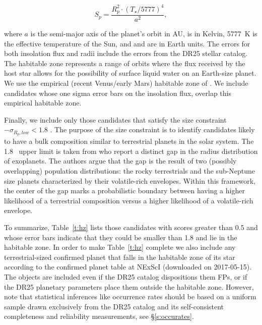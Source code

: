 \begin{equation}
S_{p} = \frac{R_{p}^{2} \cdot (T_{\star}/5777)^{4}}{a^{2}} ,
\end{equation}

\noindent where $a$ is the semi-major axis of the planet's orbit in AU, \tstar{} is in Kelvin, 5777~K is the effective temperature of the Sun, and \sp{} and \rp{} are in Earth units. The errors for both insolation flux and radii include the errors from the DR25 stellar catalog. The habitable zone represents a range of orbits where the flux received by the host star allows for the possibility of surface liquid water on an Earth-size planet.  We use the empirical (recent Venus/early Mars) habitable zone of \citet{Kopparapu2013}.  We include candidates whose one sigma error bars on the insolation flux, overlap this empirical habitable zone.  

Finally, we include only those candidates that satisfy the size constraint \rp $- \sigma_{{R_p},low} < 1.8$ \re.  The purpose of the size constraint is to identify candidates likely to have a bulk composition similar to terrestrial planets in the solar system.  The 1.8 \re\ upper limit is taken from \citet{Fulton2017} who report a distinct gap in the radius distribution of exoplanets.  The authors argue that the gap is the result of two (possibly overlapping) population distributions: the rocky terrestrials and the sub-Neptune size planets characterized by their volatile-rich envelopes.  Within this framework, the center of the gap marks a probabilistic boundary between having a higher likelihood of a terrestrial composition versus a higher likelihood of a volatile-rich envelope.

To summarize, Table~\ref{t:hz} lists those candidates with scores greater than 0.5 and whose error bars indicate that they could be smaller than 1.8 \re{} and lie in the habitable zone.  In order to make Table~\ref{t:hz} complete we also include any terrestrial-sized confirmed planet that falls in the habitable zone of its star according to the confirmed planet table at NExScI (downloaded on 2017-05-15). The objects are included even if the DR25 catalog dispositions them FPs, or if the DR25 planetary parameters place them outside the habitable zone. However, note that statistical inferences like occurrence rates should be based on a uniform sample drawn exclusively from the DR25 catalog and its self-consistent completeness and reliability measurements, see \S\ref{s:occurates}.  



